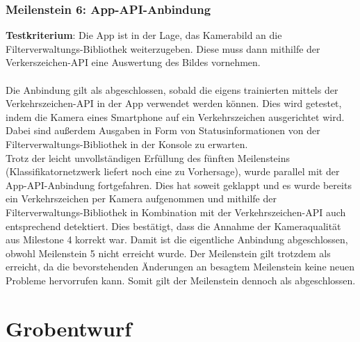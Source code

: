 \documentclass[12pt,a4paper,ngerman,enabledeprecatedfontcommands]{scrreprt}
\begin{document}
\section{Meilenstein 6: App-API-Anbindung}
\textbf{Testkriterium}: Die \gls{App} ist in der Lage, das Kamerabild an die Filterverwaltungs-Bibliothek weiterzugeben.
Diese muss dann mithilfe der Verkerszeichen-API eine Auswertung des Bildes vornehmen.\\\\
Die Anbindung gilt als abgeschlossen, sobald die eigens trainierten  mittels der Verkehrszeichen-API in der \gls{App} verwendet werden können.
Dies wird getestet, indem die Kamera eines \gls{Smartphone} auf ein Verkehrszeichen ausgerichtet wird. Dabei sind außerdem Ausgaben in Form von Statusinformationen von der \gls{Filterverwaltungs-Bibliothek} in der Konsole zu erwarten.\\
Trotz der leicht unvollständigen Erfüllung des fünften Meilensteins (Klassifikatornetzwerk liefert noch eine zu Vorhersage), wurde parallel mit der App-API-Anbindung fortgefahren.
Dies hat soweit geklappt und es wurde bereits ein Verkehrszeichen per Kamera aufgenommen und mithilfe der Filterverwaltungs-Bibliothek in Kombination mit der Verkehrszeichen-API auch entsprechend detektiert. Dies bestätigt, dass die Annahme der Kameraqualität aus Milestone 4 korrekt war. Damit ist die eigentliche Anbindung abgeschlossen, obwohl Meilenstein 5 nicht erreicht wurde.
Der Meilenstein gilt trotzdem als erreicht, da die bevorstehenden Änderungen an besagtem Meilenstein keine neuen Probleme hervorrufen kann.
Somit gilt der Meilenstein dennoch als abgeschlossen.
\\

\part{Grobentwurf}
\end{document}
